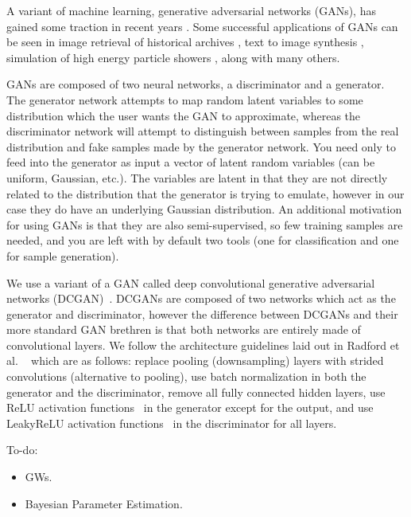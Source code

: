 \documentclass[%
showpacs,
 amsmath,amssymb,
 aps,
 twocolumn,
 prl,
 reprint,
floatfix,
]{revtex4-1}
\begin{document}
%
%

%
%
A variant of machine learning, generative adversarial networks (GANs), has gained some traction in recent years \cite{arxiv:1406.2661}. Some successful applications of GANs can be seen in image retrieval of historical archives \cite{arxiv:1607.02748}, text to image synthesis \cite{arxiv:1605.05396}, simulation of high energy particle showers \cite{arxiv:1712.10321}, along with many others. 

GANs are composed of two neural networks, a discriminator and a generator. The generator network attempts to map random latent variables to some distribution which the user wants the GAN to approximate, whereas the discriminator network will attempt to distinguish between samples from the real distribution and fake samples made by the generator network. You need only to feed into the generator as input a vector of latent random variables (can be uniform, Gaussian, etc.). The variables are latent in that they are not directly related to the distribution that the generator is trying to emulate, however in our case they do have an underlying Gaussian distribution. An additional motivation for using GANs is that they are also semi-supervised, so few training samples are needed, and you are left with by default two tools (one for classification and one for sample generation).  

We use a variant of a GAN called deep convolutional generative adversarial
networks (DCGAN)~\cite{1511.06434}. DCGANs are composed of two networks which act as
the generator and discriminator, however the difference between DCGANs and their more standard
GAN brethren is that both networks are entirely made of
convolutional layers. We follow the architecture guidelines laid out in Radford et al.
~\cite{1511.06434} which are as follows: replace pooling (downsampling) layers with strided
convolutions (alternative to pooling),
use batch normalization in both the generator and the discriminator, remove all fully
connected hidden layers, use ReLU activation functions~\cite{Nair:2010:RLU:3104322.3104425}
in the generator except for the output,
and use LeakyReLU activation functions~\cite{Maas2013RectifierNI} in the discriminator for all layers.

To-do:

\begin{itemize}
\item GWs.
\item Bayesian Parameter Estimation.
\end{itemize}
\end{document}
